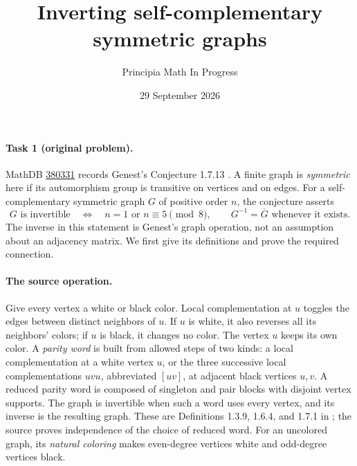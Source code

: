 \documentclass[11pt]{article}
\title{Inverting self-complementary symmetric graphs}
\author{Principia Math In Progress}
\date{29 September 2026}
\begin{document}
\maketitle

\paragraph{Task 1 (original problem).}
MathDB \href{https://mathdb.com/p/380331}{380331} records
Genest's Conjecture 1.7.13 \cite[p.~39]{Genest}.
A finite graph is \emph{symmetric} here if its automorphism group is
transitive on vertices and on edges. For a self-complementary symmetric
graph \(G\) of positive order \(n\), the conjecture asserts
\[
 G\text{ is invertible}\quad\Longleftrightarrow\quad
 n=1\text{ or }n\equiv5\pmod8,
 \qquad G^{-1}=\overline G\text{ whenever it exists}.
\]
The inverse in this statement is Genest's graph operation, not an
assumption about an adjacency matrix. We first give its definitions and
prove the required connection.

\paragraph{The source operation.}
Give every vertex a white or black color. Local complementation at \(u\)
toggles the edges between distinct neighbors of \(u\). If \(u\) is white,
it also reverses all its neighbors' colors; if \(u\) is black, it changes
no color. The vertex \(u\) keeps its own color.
A \emph{parity word} is built from allowed steps of two kinds:
a local complementation at a white vertex \(u\), or the three successive
local complementations \(uvu\), abbreviated \([uv]\), at adjacent
black vertices \(u,v\).
A reduced parity word is composed of singleton and pair blocks with
disjoint vertex supports. The graph is invertible when such a word
uses every vertex, and its inverse is the resulting graph.
These are Definitions 1.3.9, 1.6.4, and 1.7.1 in \cite{Genest};
the source proves independence of the choice of reduced word.
For an uncolored graph, its \emph{natural coloring} makes even-degree
vertices white and odd-degree vertices black.
\end{document}
